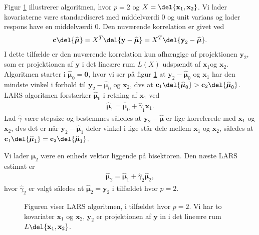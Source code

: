 Figur \ref{fig:lars} illustrerer algoritmen, hvor $p = 2$ og $X = \del{\textbf{x}_1, \textbf{x}_2}$. 
Vi lader kovariaterne være standardiseret med middelværdi 0 og unit varians og lader respons have en middelværdi 0. Den nuværende korrelation er givet ved 
\begin{align*}
\textbf{c}\del{\boldsymbol{\widehat{\mu}}} = X^T\del{\textbf{y} - \widehat{\boldsymbol{\mu}}} = X^T \del{ \textbf{y}_2 - \boldsymbol{\widehat{\mu}}}.
\end{align*}
I dette tilfælde er den nuværende korrelation kun afhængige af projektionen $\textbf{y}_2 $, som er projektionen af $\textbf{y}$ i det lineære rum $L(X)$ udspændt af $ \textbf{x}_1 $og $\textbf{x}_2$. 
Algoritmen starter i $\widehat{\boldsymbol{\mu}}_0 = \textbf{0}$, hvor vi ser på figur \ref{fig:lars} at $ \textbf{y}_2 - \boldsymbol{\widehat{\mu}}_0$ og $\textbf{x}_1$ har den mindste vinkel i forhold til $ \textbf{y}_2 - \boldsymbol{\widehat{\mu}}_0$  og $\textbf{x}_2$, dvs at $\textbf{c}_1\del{\boldsymbol{\widehat{\mu}}_0} > \textbf{c}_2\del{\boldsymbol{\widehat{\mu}}_0}$. 
LARS algoritmen forstærker  $\boldsymbol{\widehat{\mu}}_0$ i retning af $\textbf{x}_1$ ved
%
 \begin{align*}
 \boldsymbol{\widehat{\mu}}_1 = \boldsymbol{\widehat{\mu}}_0 + \widehat{\gamma}_1 \textbf{x}_1.
 \end{align*}
 Lad $\widehat{\gamma}$ være stepsize og bestemmes  således at $ \textbf{y}_2 - \boldsymbol{\widehat{\mu}}$ er lige korrelerede med $\textbf{x}_1$ og $\textbf{x}_2$, dvs det er når  $\textbf{y}_2 - \boldsymbol{\widehat{\mu}}_1$ deler vinkel i lige står dele mellem  $\textbf{x}_1$ og $\textbf{x}_2$, således at $\textbf{c}_1\del{\boldsymbol{\widehat{\mu}}_1} = \textbf{c}_2\del{\boldsymbol{\widehat{\mu}}_1}$.  
 
 Vi lader $\boldsymbol{\mu}_2$ være en enheds vektor liggende på bisektoren. Den næste LARS estimat er 
 \begin{align*}
 \boldsymbol{\widehat{\mu}}_2 = \boldsymbol{\widehat{\mu}}_1+ \widehat{\gamma}_2 \boldsymbol{\widehat{\mu}}_2,
 \end{align*}
%
hvor $\widehat{\gamma}_2$ er valgt således at  $ \boldsymbol{\widehat{\mu}}_2 = \textbf{y}_2$ i tilfældet hvor $p = 2$. 
\begin{figure}
\centering
 
\caption{Figuren viser LARS algoritmen, i tilfældet hvor $p = 2$. Vi har to kovariater  $\textbf{x}_1$ og $\textbf{x}_2$, $\textbf{y}_2$ er projektionen af $\textbf{y}$ in i det lineære rum $L  \del{ \textbf{x}_1, \textbf{x}_2} $. }\label{fig:lars}
\end{figure}

